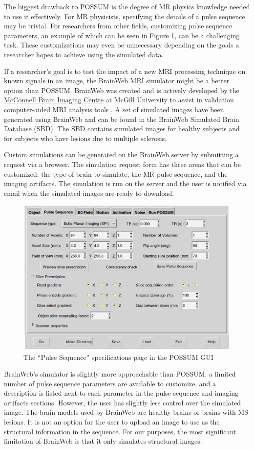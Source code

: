 The biggest drawback to POSSUM is the degree of MR physics knowledge needed to use it effectively. For MR physicists, specifying the details of a pulse sequence may be trivial. For researchers from other fields, customizing pulse sequence parameters, an example of which can be seen in Figure \ref{fig:possum}, can be a challenging task. These customizations may even be unnecessary depending on the goals a researcher hopes to achieve using the simulated data.

If a researcher's goal is to test the impact of a new MRI processing technique on known signals in an image, the BrainWeb MRI simulator might be a better option than POSSUM. BrainWeb was created and is actively developed by the \href{mcgill.ca/bic/}{McConnell Brain Imaging Centre} at McGill University to assist in validation computer-aided MRI analysis tools \cite{kwan1999mri} \cite{collins1998design} \cite{cocosco1997brainweb} \cite{kwan1996extensible}. A set of simulated images have been generated using BrainWeb and can be found in the BrainWeb Simulated Brain Database (SBD). The SBD contains simulated images for healthy subjects and for subjects who have lesions due to multiple sclerosis.

Custom simulations can be generated on the BrainWeb server by submitting a request via a browser. The simulation request form has three areas that can be customized: the type of brain to simulate, the MR pulse sequence, and the imaging artifacts. The simulation is run on the server and the user is notified via email when the simulated images are ready to download. 

\begin{figure}
\centering
\includegraphics[width=.5\textwidth]{7/possum-gui.png}
\caption{The ``Pulse Sequence'' specifications page in the POSSUM GUI}
\label{fig:possum}
\end{figure}


BrainWeb's simulator is slightly more approachable than POSSUM: a limited number of pulse sequence parameters are available to customize, and a description is listed next to each parameter in the pulse sequence and imaging artifacts sections. However, the user has slightly less control over the simulated image. The brain models used by BrainWeb are healthy brains or brains with MS lesions. It is not an option for the user to upload an image to use as the structural information in the sequence. For our purposes, the most significant limitation of BrainWeb is that it only simulates structural images. 

